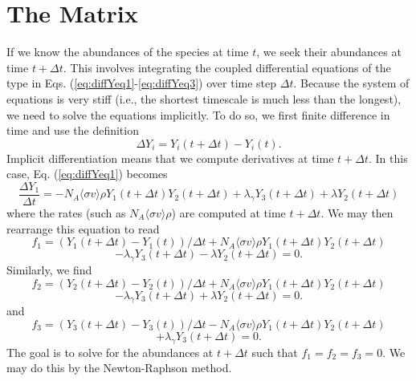 \documentclass{article}    %
\begin{document}
\section{The Matrix}

If we know the abundances of the species at time $t$, we seek their
abundances at time $t + \Delta t$.  This involves integrating the
coupled differential equations of the type in Eqs.
(\ref{eq:diffYeq1}-\ref{eq:diffYeq3}) over time step $\Delta t$.
Because the system of equations is very stiff (i.e., the shortest
timescale is much less than the longest), we need to solve the
equations implicitly.  To do so, we first finite difference in time
and use the definition
\begin{equation}
\Delta Y_i = Y_i (t + \Delta t) - Y_i (t).  \label{eq:deltaY}
\end{equation}
Implicit differentiation means that we compute derivatives at time
$t + \Delta t$.  In this case, Eq. (\ref{eq:diffYeq1}) becomes
\begin{equation}
\frac{\Delta Y_1}{\Delta t} = -N_A \langle \sigma v \rangle \rho
Y_1 ( t + \Delta t ) Y_2 ( t + \Delta t ) + \lambda_\gamma Y_3 ( t + \Delta t )
+ \lambda  Y_2 ( t + \Delta t )
\end{equation}
where the rates (such as $N_A \langle
\sigma v \rangle \rho$) are computed at time $t + \Delta t$.  We may then
rearrange this equation to read
\[
f_1 = \left( Y_1( t + \Delta t) - Y_1( t ) \right )/
{\Delta t} + N_A \langle \sigma v \rangle \rho
Y_1 ( t + \Delta t) Y_2 ( t + \Delta t )
\]
\begin{equation}
-\lambda_\gamma Y_3 ( t + \Delta t ) - \lambda Y_2 ( t + \Delta t ) = 0.
\label{eq:f1}
\end{equation}
Similarly, we find
\[
f_2 = \left( Y_2( t + \Delta t) - Y_2( t ) \right )/
{\Delta t} + N_A \langle \sigma v \rangle \rho
Y_1 ( t + \Delta t) Y_2 ( t + \Delta t )
\]
\begin{equation}
-\lambda_\gamma Y_3 ( t + \Delta t ) + \lambda Y_2 ( t + \Delta t ) = 0.
\label{eq:f2}
\end{equation}
and
\[
f_3 = \left( Y_3( t + \Delta t) - Y_3( t ) \right )/
{\Delta t} - N_A \langle \sigma v \rangle \rho
Y_1 ( t + \Delta t) Y_2 ( t + \Delta t )
\]
\begin{equation}
+\lambda_\gamma Y_3 ( t + \Delta t ) = 0.
\label{eq:f3}
\end{equation}
The goal is to solve for the abundances at $t + \Delta t$
such that $f_1 = f_2 = f_3 = 0$.  We may do this by the
Newton-Raphson method.
\end{document}
